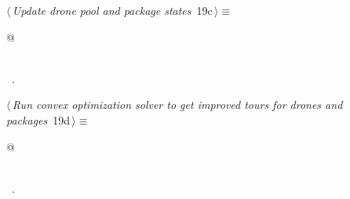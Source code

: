 \documentclass[10pt, english, oneside]{report}
\begin{document}
\begin{flushleft} \small
\begin{minipage}{\linewidth}\label{scrap19}\raggedright\small
{} $\langle\,${\itshape Update drone pool and package states}\nobreak\ {\footnotesize {19c}}$\,\rangle\equiv$
\vspace{-1ex}
\begin{list}{}{} \item
\mbox{}\verb@   @\\
\mbox{}\verb@pass@\\
\mbox{}\verb@@{\NWsep}
\end{list}
\vspace{-1.5ex}
\footnotesize
\begin{list}{}{\setlength{\itemsep}{-\parsep}\setlength{\itemindent}{-\leftmargin}}
\item \NWtxtMacroRefIn\ .

\item{}
\end{list}
\end{minipage}\vspace{4ex}
\end{flushleft}


\begin{flushleft} \small
\begin{minipage}{\linewidth}\label{scrap20}\raggedright\small
{} $\langle\,${\itshape Run convex optimization solver to get improved tours for drones and packages}\nobreak\ {\footnotesize {19d}}$\,\rangle\equiv$
\vspace{-1ex}
\begin{list}{}{} \item
\mbox{}\verb@   @\\
\mbox{}\verb@pass@\\
\mbox{}\verb@@{\NWsep}
\end{list}
\vspace{-1.5ex}
\footnotesize
\begin{list}{}{\setlength{\itemsep}{-\parsep}\setlength{\itemindent}{-\leftmargin}}
\item \NWtxtMacroRefIn\ .

\item{}
\end{list}
\end{minipage}\vspace{4ex}
\end{flushleft}
\end{document}
